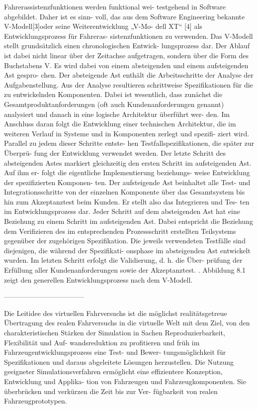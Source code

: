 Fahrerassistenzfunktionen werden funktional wei- testgehend in Software abgebildet. Daher ist es sinn- voll, das aus dem Software Engineering bekannte V-Modell[3]oder seine Weiterentwicklung „V-Mo- dell XT“ [4] als Entwicklungsprozess für Fahreras- sistenzfunktionen zu verwenden. Das V-Modell stellt grundsätzlich einen chronologischen Entwick- lungsprozess dar. Der Ablauf ist dabei nicht linear über der Zeitachse aufgetragen, sondern über die Form des Buchstabens V. Es wird dabei von einem absteigenden und einem aufsteigenden Ast gespro- chen. Der absteigende Ast enthält die Arbeitsschritte der Analyse der Aufgabenstellung. Aus der Analyse resultieren schrittweise Spezifikationen für die zu entwickelnden Komponenten. Dabei ist wesentlich, dass zunächst die Gesamtproduktanforderungen (oft auch Kundenanforderungen genannt) analysiert und danach in eine logische Architektur überführt wer- den. Im Anschluss daran folgt die Entwicklung einer technischen Architektur, die im weiteren Verlauf in Systeme und in Komponenten zerlegt und spezifi- ziert wird. Parallel zu jedem dieser Schritte entste- hen Testfallspezifikationen, die später zur Überprü- fung der Entwicklung verwendet werden. Der letzte Schritt des absteigenden Astes markiert gleichzeitig den ersten Schritt im aufsteigenden Ast. Auf ihm er- folgt die eigentliche Implementierung beziehungs- weise Entwicklung der spezifizierten Komponen- ten. Der aufsteigende Ast beinhaltet alle Test- und Integrationsschritte von der einzelnen Komponente über das Gesamtsystem bis hin zum Akzeptanztest beim Kunden. Er stellt also das Integrieren und Tes- ten im Entwicklungsprozess dar. Jeder Schritt auf dem absteigenden Ast hat eine Beziehung zu einem Schritt im aufsteigenden Ast. Dabei entspricht die Beziehung dem Verifizieren des im entsprechenden Prozessschritt erstellten Teilsystems gegenüber der zugehörigen Spezifikation. Die jeweils verwendeten Testfälle sind diejenigen, die während der Spezifikati- onsphase im absteigenden Ast entwickelt wurden. Im letzten Schritt erfolgt die Validierung, d. h. die Über- prüfung der Erfüllung aller Kundenanforderungen sowie der Akzeptanztest. . Abbildung 8.1 zeigt den generellen Entwicklungsprozess nach dem V-Modell.

-----------------------------------

Die Leitidee des virtuellen Fahrversuchs ist die möglichst realitätsgetreue Übertragung des realen Fahrversuchs in die virtuelle Welt mit dem Ziel, von den charakteristischen Stärken der Simulation in Sachen Reproduzierbarkeit, Flexibilität und Auf- wandsreduktion zu profitieren und früh im Fahrzeugentwicklungsprozess eine Test- und Bewer- tungsmöglichkeit für Spezifikationen und daraus abgeleitete Lösungen herzustellen. Die Nutzung geeigneter Simulationsverfahren ermöglicht eine effizientere Konzeption, Entwicklung und Applika- tion von Fahrzeugen und Fahrzeugkomponenten. Sie überbrücken und verkürzen die Zeit bis zur Ver- fügbarkeit von realen Fahrzeugprototypen. 

